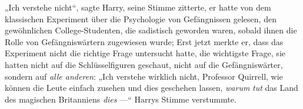 „Ich verstehe nicht“, sagte Harry, seine Stimme zitterte, er hatte von dem klassischen Experiment über die Psychologie von Gefängnissen gelesen, den gewöhnlichen College-Studenten, die sadistisch geworden waren, sobald ihnen die Rolle von Gefängniswärtern zugewiesen wurde; Erst jetzt merkte er, dass das Experiment nicht die richtige Frage untersucht hatte, die wichtigste Frage, sie hatten nicht auf die Schlüsselfiguren geschaut, nicht auf die Gefängniswärter, sondern auf \emph{alle anderen}:
„Ich verstehe wirklich nicht, Professor Quirrell, wie können die Leute einfach zusehen und dies geschehen lassen, \emph{warum} \emph{tut} das Land des magischen Britanniens \emph{dies} —“ Harrys Stimme verstummte.

